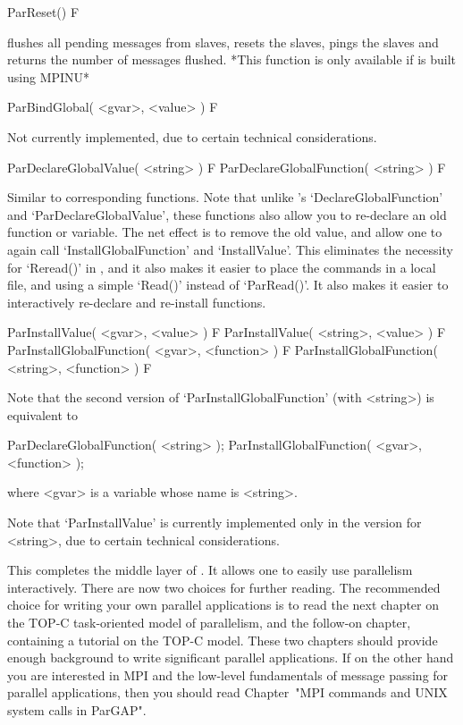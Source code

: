 \>ParReset() F

flushes all pending messages from slaves, resets the  slaves,  pings  the
slaves and returns the number of messages flushed. 
*This function is only available if {\ParGAP} is built using MPINU*

\>ParBindGlobal( <gvar>, <value> ) F

Not currently implemented, due to certain technical considerations.

\>ParDeclareGlobalValue( <string> ) F
\>ParDeclareGlobalFunction( <string> ) F

Similar to corresponding {\GAP}  functions.  Note  that  unlike  {\GAP}'s
`DeclareGlobalFunction' and `ParDeclareGlobalValue', these functions also
allow you to re-declare an old function or variable. The net effect is to
remove the old value, and allow one to again call `InstallGlobalFunction'
and `InstallValue'. This  eliminates  the  necessity  for  `Reread()'  in
{\ParGAP}, and it also makes it easier to place the commands in  a  local
file, and using a simple `Read()' instead of `ParRead()'. It  also  makes
it easier to interactively re-declare and re-install functions.

\>ParInstallValue( <gvar>, <value> ) F
\>ParInstallValue( <string>, <value> ) F
\>ParInstallGlobalFunction( <gvar>, <function> ) F
\>ParInstallGlobalFunction( <string>, <function> ) F

Note  that  the  second  version  of   `ParInstallGlobalFunction'   (with
<string>) is equivalent to

ParDeclareGlobalFunction( <string> );
ParInstallGlobalFunction( <gvar>, <function> );

where <gvar> is a {\GAP} variable whose name is <string>.

Note that `ParInstallValue' is currently implemented only in the  version
for <string>, due to certain technical considerations.

This completes the middle layer of {\ParGAP}. It allows one to easily use
parallelism interactively. There are now two choices for further reading.
The recommended choice for writing your own parallel applications  is  to
read the next chapter on the TOP-C task-oriented  model  of  parallelism,
and the follow-on chapter, containing a  tutorial  on  the  TOP-C  model.
These two chapters should provide enough background to write  significant
parallel applications. If on the other hand you are interested in MPI and
the low-level fundamentals of message passing for parallel  applications,
then you should read Chapter~"MPI  commands  and  UNIX  system  calls  in
ParGAP".

